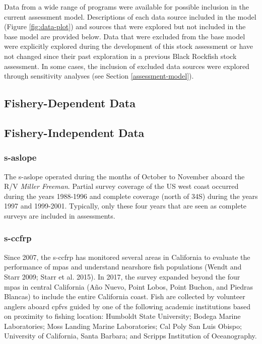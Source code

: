 \documentclass[11pt,
  english,
  letterpaper,
]{article}
\begin{document}
Data from a wide range of programs were available for possible inclusion in the current assessment model. Descriptions of each data source included in the model (Figure \ref{fig:data-plot}) and sources that were explored but not included in the base model are provided below. Data that were excluded from the base model were explicitly explored during the development of this stock assessment or have not changed since their past exploration in a previous Black Rockfish stock assessment. In some cases, the inclusion of excluded data sources were explored through sensitivity analyses (see Section \ref{assessment-model}).

\hypertarget{fishery-dependent-data}{%
\subsection{Fishery-Dependent Data}\label{fishery-dependent-data}}

\hypertarget{fishery-independent-data}{%
\subsection{Fishery-Independent Data}\label{fishery-independent-data}}

\hypertarget{section}{%
\subsubsection{\texorpdfstring{\acrlong{s-aslope}}{}}\label{section}}

The \gls{s-aslope} operated during the months of October to November aboard the R/V \emph{Miller Freeman}. Partial survey coverage of the US west coast occurred during the years 1988-1996 and complete coverage (north of 34\textquotesingle S) during the years 1997 and 1999-2001. Typically, only these four years that are seen as complete surveys are included in assessments.

\hypertarget{section-1}{%
\subsubsection{\texorpdfstring{\acrlong{s-ccfrp}}{}}\label{section-1}}

Since 2007, the \gls{s-ccfrp} has monitored several areas in California to evaluate the performance of \glspl{mpa} and understand nearshore fish populations (Wendt and Starr 2009; Starr et al. 2015). In 2017, the survey expanded beyond the four \Gls{mpa}s in central California (Año Nuevo, Point Lobos, Point Buchon, and Piedras Blancas) to include the entire California coast. Fish are collected by volunteer anglers aboard \glspl{cpfv} guided by one of the following academic institutions based on proximity to fishing location: Humboldt State University; Bodega Marine Laboratories; Moss Landing Marine Laboratories; Cal Poly San Luis Obispo; University of California, Santa Barbara; and Scripps Institution of Oceanography.
\end{document}
